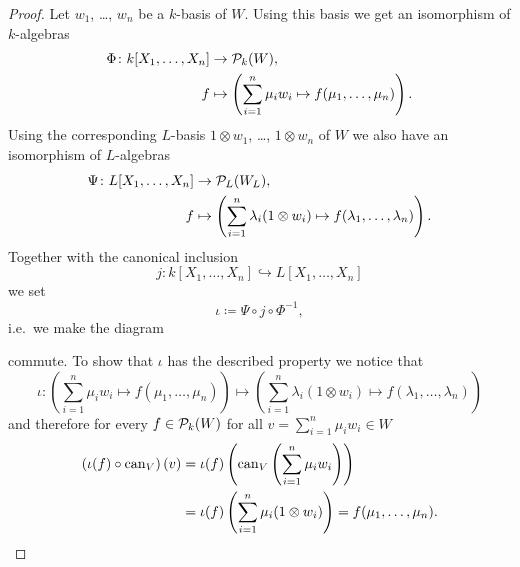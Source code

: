 \begin{proof}
 Let $w_1$, \dots, $w_n$ be a $k$-basis of $W$. Using this basis we get an isomorphism of $k$-algebras
 \begin{align*}
  \Phi \colon k[X_1, \dotsc, X_n] &\to \mathcal{P}_k(W), \\
  f &\mapsto \left( \sum_{i=1}^n \mu_i w_i \mapsto f(\mu_1, \dotsc, \mu_n) \right).
 \end{align*}
 Using the corresponding $L$-basis $1 \otimes w_1$, \dots, $1 \otimes w_n$ of $W$ we also have an isomorphism of $L$-algebras
 \begin{align*}
  \Psi \colon L[X_1, \dotsc, X_n] &\to \mathcal{P}_L(W_L), \\
  f &\mapsto \left( \sum_{i=1}^n \lambda_i (1 \otimes w_i) \mapsto f(\lambda_1, \dotsc, \lambda_n) \right).
 \end{align*}
 Together with the canonical inclusion
 \[
  j \colon k[X_1, \dotsc, X_n] \hookrightarrow L[X_1, \dotsc, X_n]
 \]
 we set
 \[
  \iota \coloneqq \Psi \circ j \circ \Phi^{-1},
 \]
 i.e.\ we make the diagram
 \begin{center}
 \end{center}
 commute. To show that $\iota$ has the described property we notice that
 \[
  \iota \colon
  \left( \sum_{i=1}^n \mu_i w_i \mapsto f(\mu_1, \dotsc, \mu_n) \right)
  \mapsto
  \left( \sum_{i=1}^n \lambda_i (1 \otimes w_i) \mapsto f(\lambda_1, \dotsc, \lambda_n) \right)
 \]
 and therefore for every $f \in \mathcal{P}_k(W)$ for all $v = \sum_{i=1}^n \mu_i w_i \in W$
 \begin{align*}
  \left( \iota(f) \circ \operatorname{can}_V \right)(v)
  &= \iota(f)\left( \operatorname{can}_V\left( \sum_{i=1}^n \mu_i w_i \right) \right) \\
  &= \iota(f)\left( \sum_{i=1}^n \mu_i (1 \otimes w_i) \right)
  = f(\mu_1, \dotsc, \mu_n).
 \end{align*}
 

\end{proof}
